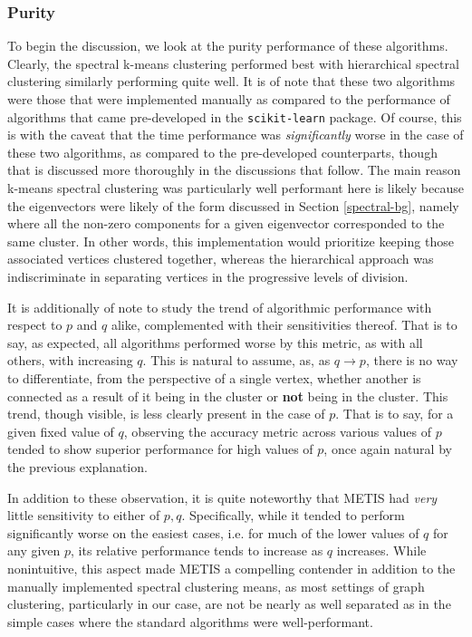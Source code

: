 \documentclass{article}
\begin{document}
\subsubsection{Purity}
To begin the discussion, we look at the purity performance of these algorithms. Clearly, the spectral k-means clustering performed best with hierarchical spectral clustering similarly performing quite well. It is of note that these two algorithms were those that were implemented manually as compared to the performance of algorithms that came pre-developed in the \texttt{scikit-learn} package. Of course, this is with the caveat that the time performance was \textit{significantly} worse in the case of these two algorithms, as compared to the pre-developed counterparts, though that is discussed more thoroughly in the discussions that follow. The main reason k-means spectral clustering was particularly well performant here is likely because the eigenvectors were likely of the form discussed in Section \ref{spectral-bg}, namely where all the non-zero components for a given eigenvector corresponded to the same cluster. In other words, this implementation would prioritize keeping those associated vertices clustered together, whereas the hierarchical approach was indiscriminate in separating vertices in the progressive levels of division.

It is additionally of note to study the trend of algorithmic performance with respect to $p$ and $q$ alike, complemented with their sensitivities thereof. That is to say, as expected, all algorithms performed worse by this metric, as with all others, with increasing $q$. This is natural to assume, as, as $q\rightarrow p$, there is no way to differentiate, from the perspective of a single vertex, whether another is connected as a result of it being in the cluster or \textbf{not} being in the cluster. This trend, though visible, is less clearly present in the case of $p$. That is to say, for a given fixed value of $q$, observing the accuracy metric across various values of $p$ tended to show superior performance for high values of $p$, once again natural by the previous explanation.

In addition to these observation, it is quite noteworthy that METIS had \textit{very} little sensitivity to either of $p,q$. Specifically, while it tended to perform significantly worse on the easiest cases, i.e. for much of the lower values of $q$ for any given $p$, its relative performance tends to increase as $q$ increases. While nonintuitive, this aspect made METIS a compelling contender in addition to the manually implemented spectral clustering means, as most settings of graph clustering, particularly in our case, are not be nearly as well separated as in the simple cases where the standard algorithms were well-performant.
\end{document}
